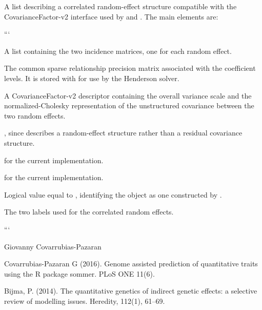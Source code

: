 \documentclass[a4paper]{book}
\begin{document}
\begin{Value}

A list describing a correlated random-effect structure compatible with
the CovarianceFactor-v2 interface used by  and
. The main elements are:

\begin{description}


```
\item[\code{Z}] 
A list containing the two incidence matrices, one for each random
effect.


\item[\code{Gu}] 
The common sparse relationship precision matrix associated with
the coefficient levels. It is stored with
 for use by the Henderson solver.


\item[\code{covStruct}] 
A CovarianceFactor-v2 descriptor containing the overall variance
scale and the normalized-Cholesky representation of the
 unstructured covariance between the two random
effects.


\item[\code{residualLocalIndex}] 
, since  describes a random-effect structure
rather than a residual covariance structure.


\item[\code{productDesign}] 
 for the current implementation.


\item[\code{partitionsR}] 
 for the current implementation.


\item[\code{covm}] 
Logical value equal to , identifying the object as one
constructed by .


\item[\code{covm\_labels}] 
The two labels used for the correlated random effects.

```


\end{description}

\end{Value}
%
\begin{Author}\relax
Giovanny Covarrubias-Pazaran
\end{Author}
%
\begin{References}\relax

Covarrubias-Pazaran G (2016).
Genome assisted prediction of quantitative traits using the R package
sommer. PLoS ONE 11(6).

Bijma, P. (2014).
The quantitative genetics of indirect genetic effects: a selective
review of modelling issues.
Heredity, 112(1), 61--69.
\end{References}
\end{document}
